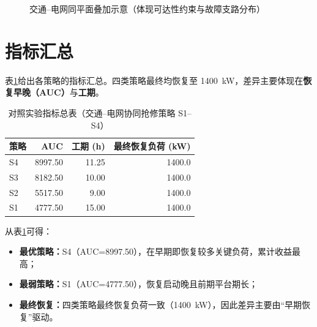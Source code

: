 \documentclass[UTF8,zihao=-4,a4paper,fontset=fandol]{ctexrep}
\begin{document}
\begin{figure}[H]
\caption{交通--电网同平面叠加示意（体现可达性约束与故障支路分布）}
\label{fig:road_power_overlay_tikz}
\end{figure}


\section{指标汇总}
表\ref{tab:exp_summary}给出各策略的指标汇总。四类策略最终均恢复至 \SI{1400}{kW}，差异主要体现在\textbf{恢复早晚（AUC）}与\textbf{工期}。

\begin{table}[H]
\centering
\caption{对照实验指标总表（交通--电网协同抢修策略 S1--S4）}
\label{tab:exp_summary}
\begin{tabular}{lrrr}
\toprule
策略 & AUC & 工期 (h) & 最终恢复负荷 (kW) \\
\midrule
S4 & 8997.50 & 11.25 & 1400.0 \\
S3 & 8182.50 & 10.00 & 1400.0 \\
S2 & 5517.50 & 9.00  & 1400.0 \\
S1 & 4777.50 & 15.00 & 1400.0 \\
\bottomrule
\end{tabular}
\end{table}

\noindent 从表\ref{tab:exp_summary}可得：
\begin{itemize}[leftmargin=2em]
  \item \textbf{最优策略：}S4（AUC=\num{8997.50}），在早期即恢复较多关键负荷，累计收益最高；
  \item \textbf{最弱策略：}S1（AUC=\num{4777.50}），恢复启动晚且前期平台期长；
  \item \textbf{最终恢复：}四类策略最终恢复负荷一致（\SI{1400}{kW}），因此差异主要由“早期恢复”驱动。
\end{itemize}
\end{document}
